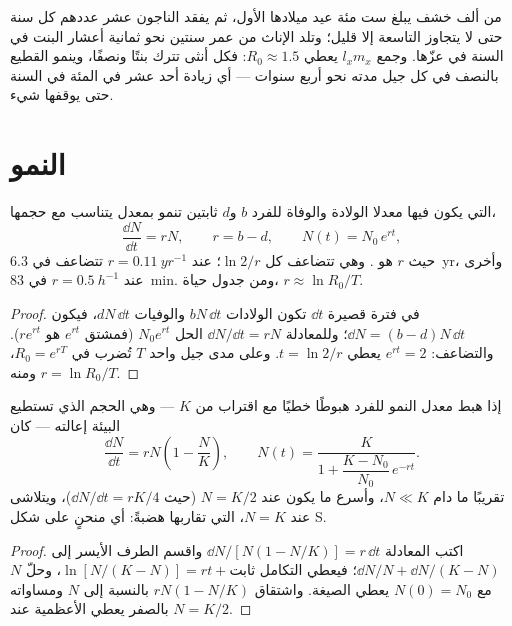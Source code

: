 \begin{example}\label{ex:b1:populations:deer}
من ألف خشف يبلغ ست مئة عيد ميلادها الأول، ثم يفقد الناجون عشر
عددهم كل سنة حتى لا يتجاوز التاسعة إلا قليل؛ وتلد الإناث من عمر
سنتين نحو ثمانية أعشار البنت في السنة في عزّها. وجمع $l_x m_x$
يعطي $R_0 \approx 1.5$: فكل أنثى تترك بنتًا ونصفًا، وينمو القطيع
بالنصف في كل جيل مدته نحو أربع سنوات --- أي زيادة أحد عشر في المئة
في السنة حتى يوقفها شيء.
\end{example}

\section{النمو}

\begin{theorem}\label{thm:b1:populations:exponential}
 التي يكون فيها معدلا الولادة والوفاة للفرد $b$ و$d$ ثابتين
تنمو بمعدل يتناسب مع حجمها،
\[
\frac{\dd N}{\dd t} = rN, \qquad r = b - d, \qquad N(t) = N_0\,e^{rt},
\]
حيث $r$ هو \emph{}. وهي تتضاعف كل
$\ln 2/r$؛  عند $r = \qty{0.11}{yr^{-1}}$ تتضاعف في
\qty{6.3}{yr}، وأخرى عند $r = \qty{0.5}{h^{-1}}$ في \qty{83}{min}.
ومن جدول حياة، $r \approx \ln R_0 / T$.
\end{theorem}
\begin{proof}
في فترة قصيرة $\dd t$ تكون الولادات $bN\,\dd t$ والوفيات
$dN\,\dd t$، فيكون $\dd N = (b - d)N\,\dd t$؛ وللمعادلة
$\dd N/\dd t = rN$ الحل $N_0 e^{rt}$ (فمشتق
$e^{rt}$ هو $re^{rt}$). والتضاعف: $e^{rt} = 2$ يعطي $t = \ln 2/r$.
وعلى مدى جيل واحد $T$ تُضرب  في $R_0 = e^{rT}$،
ومنه $r = \ln R_0/T$.
\end{proof}

\begin{theorem}\label{thm:b1:populations:logistic}
إذا هبط معدل النمو للفرد هبوطًا خطيًا مع اقتراب  من
\emph{} $K$ --- وهي الحجم الذي تستطيع البيئة إعالته ---
كان
\[
\frac{\dd N}{\dd t} = rN\left(1 - \frac{N}{K}\right), \qquad
N(t) = \frac{K}{1 + \dfrac{K - N_0}{N_0}\,e^{-rt}} .
\]
 تقريبًا ما دام $N \ll K$، وأسرع ما يكون عند $N = K/2$
(حيث $\dd N/\dd t = rK/4$)، ويتلاشى عند $N = K$، التي تقاربها
 هضبةً: أي منحنٍ على شكل S.
\end{theorem}
\begin{proof}
اكتب المعادلة $\dd N/[N(1 - N/K)] = r\,\dd t$ واقسم الطرف
الأيسر إلى $\dd N/N + \dd N/(K - N)$؛ فيعطي التكامل
$\ln[N/(K - N)] = rt + \text{ثابت}$، وحلّ $N$ مع $N(0) =
N_0$ يعطي الصيغة. واشتقاق $rN(1 - N/K)$ بالنسبة إلى
$N$ ومساواته بالصفر يعطي الأعظمية عند $N = K/2$.
\end{proof}

